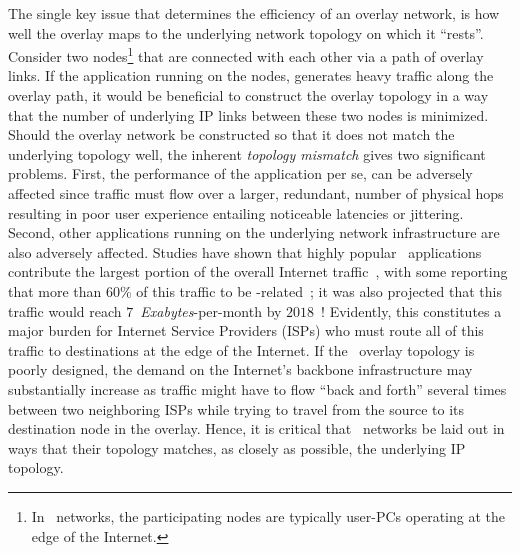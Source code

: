 The single key issue that determines the efficiency of an overlay network,
is how well the overlay maps to the underlying network topology on which it
``rests''. 
Consider two nodes\footnote{In \p\ networks,
the participating nodes are typically user-PCs operating at the edge of the
Internet.} that are connected with each other via a path of overlay links.
If the application running on the nodes, generates heavy traffic along
the overlay path, it would be beneficial to
construct the overlay topology in a way that the number of 
underlying IP links between these two nodes is minimized.
Should the overlay network be constructed so that
it does not match the underlying topology well, 
the inherent \emph{topology mismatch} gives two
significant problems. First, the performance of the application per se, can be
adversely affected since traffic must flow over a larger,
redundant, number of physical hops resulting in poor user experience 
entailing noticeable latencies or jittering. 
Second, other applications running
on the underlying network infrastructure are also adversely affected.
Studies have shown that highly popular \p\ applications contribute 
the largest portion of the overall 
Internet traffic~\cite{seroiu_analysiscds_2002,sen_analyzep2ptraffic_2004,krp_ispfear_2005}, with some reporting that more than $60$\% of this traffic 
to be \p-related~\cite{cachelogic,ipoque2009};
it was also projected that this traffic would reach
$7$~\emph{Exabytes}-per-month by $2018$~\cite{CVNI2014}! 
Evidently, this constitutes a major burden for 
Internet Service Providers (ISPs) who must route 
all of this traffic to destinations at the edge of the Internet. 
If the \p\ overlay topology is poorly designed, 
the demand on the Internet's backbone infrastructure may 
substantially increase as traffic might have to flow
``back and forth'' several times between two neighboring ISPs
while trying to travel from the source to its destination node
in the overlay.
Hence, it is critical that \p\ networks be laid out 
in ways that their topology matches, as closely as possible, the 
underlying IP topology.

